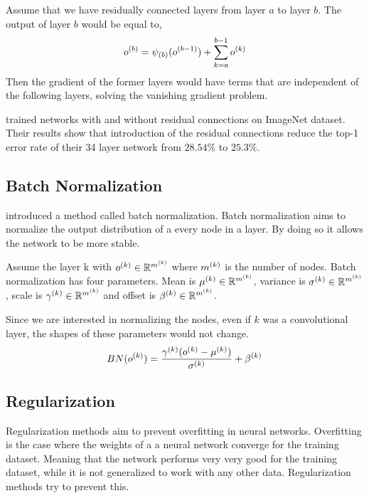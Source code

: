 Assume that we have residually connected layers from layer $a$ to layer $b$. The output of layer $b$ would be equal to,
$$ o^{(b)} = \psi_{(b)}(o^{(b-1)}) + \sum_{k=a}^{b-1} o^{(k)} $$
Then the gradient of the former layers would have terms that are independent of the following layers, solving the vanishing gradient problem.

\cite{He:2015aa} trained networks with and without residual connections on ImageNet dataset. Their results show that introduction of the residual connections reduce the top-1 error rate of their 34 layer network from $28.54\%$ to $25.3\%$.

\subsection{Batch Normalization}
\cite{ioffe2015batch} introduced a method called batch normalization. Batch normalization aims to normalize the output distribution of a every node in a layer. By doing so it allows the network to be more stable. 

Assume the layer k with $o^{(k)} \in \mathbb{R}^{m^{(k)}}$ where $m^{(k)}$ is the number of nodes. Batch normalization has four parameters. Mean is $\mu^{(k)} \in \mathbb{R}^{m^{(k)}}$, variance is $\sigma^{(k)} \in \mathbb{R}^{m^{(k)}}$, scale is $\gamma^{(k)} \in \mathbb{R}^{m^{(k)}}$ and offset is $\beta^{(k)} \in \mathbb{R}^{m^{(k)}}$. 

Since we are interested in normalizing the nodes, even if $k$ was a convolutional layer, the shapes of these parameters would not change.
$$ BN(o^{(k)}) = \frac{\gamma^{(k)}(o^{(k)}-\mu^{(k)})}{\sigma^{(k)}}+\beta^{(k)} $$

\iffalse
\subsubsection{Fused Batchnorm}
Instead of directly implementing the formula, they implement a more efficient version of it in Fused Batch normalization. 
\todoin{more details and better description here.}
\fi

\subsection{Regularization}
Regularization methods aim to prevent overfitting in neural networks. Overfitting is the case where the weights of a a neural network converge for the training dataset. Meaning that the network performs very very good for the training dataset, while it is not generalized to work with any other data. Regularization methods try to prevent this.

